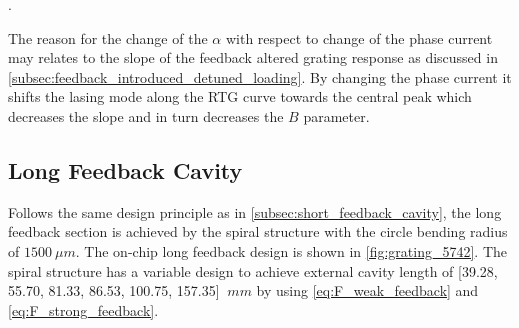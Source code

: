\begin{table}[ht]
    \centering
    \caption{Measured chirp parameter $\alpha$ by fixing the gain current at $75 \ mA$ and scan the phase section in the external feedback section from $10 \ mA$ to $14 \ mA$. Increasement of the chirp parameter $\alpha$ is observed from $1.793$ to $3.245$}.
    \label{tab:chirp_6559}
\end{table}

The reason for the change of the $\alpha$ with respect to change of the phase current may relates to the slope of the feedback altered grating response as discussed in \autoref{subsec:feedback_introduced_detuned_loading}. By changing the phase current it shifts the lasing mode along the RTG curve towards the central peak which decreases the slope and in turn decreases the $B$ parameter.

\subsection{Long Feedback Cavity} \label{subsec:long_feedback_cavity}
Follows the same design principle as in \autoref{subsec:short_feedback_cavity}, the long feedback section is achieved by the spiral structure with the circle bending radius of $1500 \ \mu m$. The on-chip long feedback design is shown in \autoref{fig:grating_5742}. The spiral structure has a variable design to achieve external cavity length of [39.28, 55.70, 81.33, 86.53, 100.75, 157.35] $\ mm$ by using \autoref{eq:F_weak_feedback} and \autoref{eq:F_strong_feedback}.

